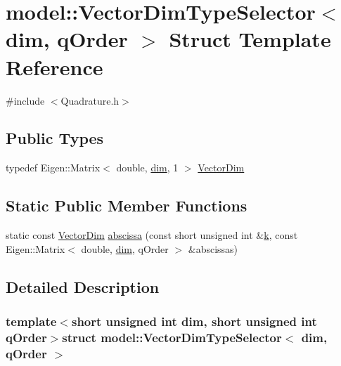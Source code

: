 \hypertarget{structmodel_1_1_vector_dim_type_selector}{}\section{model\+:\+:Vector\+Dim\+Type\+Selector$<$ dim, q\+Order $>$ Struct Template Reference}
\label{structmodel_1_1_vector_dim_type_selector}


{\ttfamily \#include $<$Quadrature.\+h$>$}

\subsection*{Public Types}
\begin{DoxyCompactItemize}
\item 
typedef Eigen\+::\+Matrix$<$ double, \hyperlink{plot_nd_a_8m_a382f3ca768b275b8d563604f7fc7df73}{dim}, 1 $>$ \hyperlink{structmodel_1_1_vector_dim_type_selector_aa4ae24168235d23a961b74dca53c76e7}{Vector\+Dim}
\end{DoxyCompactItemize}
\subsection*{Static Public Member Functions}
\begin{DoxyCompactItemize}
\item 
static const \hyperlink{structmodel_1_1_vector_dim_type_selector_aa4ae24168235d23a961b74dca53c76e7}{Vector\+Dim} \hyperlink{structmodel_1_1_vector_dim_type_selector_a84b72af135146159a6667ad4c97c3c87}{abscissa} (const short unsigned int \&\hyperlink{_f_e_m_2linear__elasticity__3d_2tetgen_2generate_p_o_l_ycube_8m_a5d2aad4440da75aa43f2643e72b1a3bd}{k}, const Eigen\+::\+Matrix$<$ double, \hyperlink{plot_nd_a_8m_a382f3ca768b275b8d563604f7fc7df73}{dim}, q\+Order $>$ \&abscissas)
\end{DoxyCompactItemize}


\subsection{Detailed Description}
\subsubsection*{template$<$short unsigned int dim, short unsigned int q\+Order$>$struct model\+::\+Vector\+Dim\+Type\+Selector$<$ dim, q\+Order $>$}



